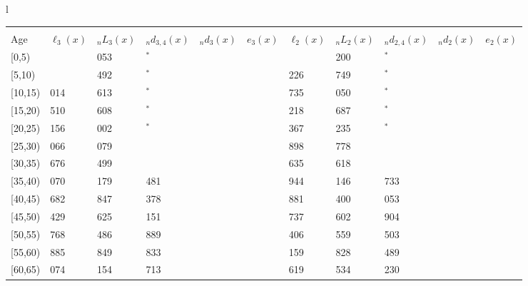 \documentclass[
]{article}
\begin{document}
\begin{table}
\begin{tabular}[t]{l}
\end{tabular}
\centering
\begin{tabular}[t]{l}
\hline
\begin{tabular}{>{\raggedright\arraybackslash}p{.43in}>{\raggedleft\arraybackslash}p{.42in}>{\raggedleft\arraybackslash}p{.42in}>{\raggedleft\arraybackslash}p{.42in}>{\raggedleft\arraybackslash}p{.42in}>{\raggedleft\arraybackslash}p{.42in}>{\raggedleft\arraybackslash}p{.42in}>{\raggedleft\arraybackslash}p{.42in}>{\raggedleft\arraybackslash}p{.42in}>{\raggedleft\arraybackslash}p{.42in}>{\raggedleft\arraybackslash}p{.42in}}
\toprule
\multicolumn{1}{c}{ } & \multicolumn{5}{c}{(2) Lost mother only} & \multicolumn{5}{c}{(3) Lost father only} \\
\cmidrule(l{3pt}r{3pt}){2-6} \cmidrule(l{3pt}r{3pt}){7-11}
Age & $\ell_{3}(x)$ & ${}_nL_{3}(x)$ & ${}_nd_{3,4}(x)$ & ${}_nd_{3}(x)$ & $e_{3}(x)$ & $\ell_{2}(x)$ & ${}_nL_{2}(x)$ & ${}_nd_{2,4}(x)$ & ${}_nd_{2}(x)$ & $e_{2}(x)$\\
\midrule
{}[0,5) & 0 & 1 053 & 33$^{*}$ & 1 & 4 & 0 & 2 200 & 0$^{*}$ & 2 & 12\\
{}[5,10) & 502 & 3 492 & 0$^{*}$ & 0 & 4 & 1 226 & 9 749 & 0$^{*}$ & 1 & 12\\
{}[10,15) & 1 014 & 6 613 & 65$^{*}$ & 1 & 4 & 2 735 & 18 050 & 16$^{*}$ & 2 & 12\\
{}[15,20) & 1 510 & 9 608 & 171$^{*}$ & 3 & 4 & 4 218 & 28 687 & 87$^{*}$ & 9 & 12\\
{}[20,25) & 2 156 & 15 002 & 221$^{*}$ & 7 & 4 & 6 367 & 42 235 & 130$^{*}$ & 20 & 12\\
\addlinespace
{}[25,30) & 3 066 & 23 079 & 327 & 13 & 4 & 8 898 & 59 778 & 518 & 35 & 11\\
{}[30,35) & 4 676 & 31 499 & 952 & 25 & 4 & 11 635 & 79 618 & 764 & 63 & 11\\
{}[35,40) & 6 070 & 38 179 & 1 481 & 38 & 4 & 14 944 & 101 146 & 1 733 & 99 & 10\\
{}[40,45) & 6 682 & 43 847 & 2 378 & 59 & 3 & 18 881 & 118 400 & 2 053 & 160 & 9\\
{}[45,50) & 7 429 & 50 625 & 2 151 & 111 & 3 & 21 737 & 135 602 & 2 904 & 297 & 8\\
\addlinespace
{}[50,55) & 7 768 & 53 486 & 3 889 & 181 & 2 & 24 406 & 141 559 & 6 503 & 480 & 6\\
{}[55,60) & 6 885 & 46 849 & 3 833 & 244 & 2 & 25 159 & 147 828 & 7 489 & 770 & 5\\
{}[60,65) & 5 074 & 44 154 & 4 713 & 366 & 1 & 21 619 & 110 534 & 10 230 & 915 & 4\\

\end{tabular}
\end{tabular}
\end{table}
\end{document}
